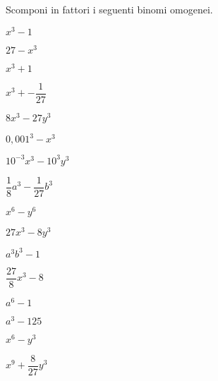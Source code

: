 \begin{esercizio}
\label{ese:17.16}
 Scomponi in fattori i seguenti binomi omogenei.
 \begin{multicols}{4}
 \begin{enumeratea}
 \item \(x^{3}-1\)
 \item \(27-x^{3}\)
 \item \(x^{3}+1\)
 \item \(x^{3}+-\dfrac{1}{27}\)
 \item \(8x^{3}-27y^{3}\)
 \item \(0,001^{3}-x^{3}\)
 \item \(10^{-3}x^{3}-10^{3}y^{3}\)
 \item \(\dfrac{1}{8}a^{3}-\dfrac{1}{27}b^{3}\)
 \item \(x^{6}-y^{6}\)
 \item \(27x^{3}-8y^{3}\)
 \item \(a^{3}b^{3}-1\)
 \item \(\dfrac{27}{8}x^{3}-8\)
 \item \(a^{6}-1\)
 \item \(a^{3}-125\)
 \item \(x^{6}-y^{3}\)
 \item \(x^{9}+\dfrac{8}{27}y^{3}\)
 \end{enumeratea}
 \end{multicols}
\end{esercizio}


